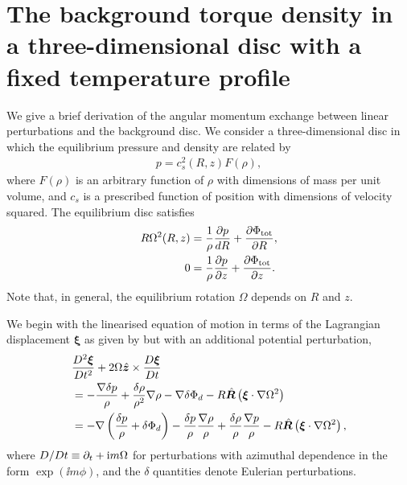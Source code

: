 \section{The background torque density in a three-dimensional disc with
  a fixed temperature profile}\label{tbg_deriv}
We give a brief derivation of the angular momentum exchange between
linear perturbations and the background disc. We consider a
three-dimensional disc in which the equilibrium pressure and density
are related by 
\begin{align}\label{iso_cond}
  p = c_s^2(R,z)F(\rho),
\end{align} 
where $F(\rho)$ is an arbitrary function of $\rho$ with dimensions of
mass per unit volume, and $c_s$ is a prescribed function of
position with dimensions of velocity squared. The equilibrium disc
satisfies 
\begin{align}
  R\Omega^2(R,z) &= \frac{1}{\rho}\frac{\partial p}{d R} +
  \frac{\partial\Phi_\mathrm{tot}}{\partial R}, \\
  0 &= \frac{1}{\rho}\frac{\partial p}{\partial z} + \frac{\partial\Phi_\mathrm{tot}}{\partial
    z}. 
\end{align}
Note that, in general, the equilibrium rotation $\Omega$ depends on
$R$ and $z$. 

We begin with the linearised equation of motion in terms of the
Lagrangian displacement $\bm{\xi}$ as given by \cite{lin93b} but with an
additional potential perturbation, 
\begin{align}\label{lagragian_pert}
  &\frac{D^2\bm{\xi}}{Dt^2} +
  2\Omega\hat{\bm{z}}\times\frac{D\bm{\xi}}{Dt}  \notag \\ &= -
  \frac{\nabla \delta p }{\rho} + \frac{\delta\rho}{\rho^2}\nabla\rho  
  -\nabla\delta\Phi_d - R
  \hat{\bm{R}}\left(\bm{\xi}\cdot\nabla\Omega^2\right) \notag \\
  & = -\nabla\left(\frac{\delta p}{\rho} + \delta \Phi_d\right) -
  \frac{\delta p}{\rho}\frac{\nabla\rho}{\rho} +
  \frac{\delta\rho}{\rho}\frac{\nabla p}{\rho} -  R
  \hat{\bm{R}}\left(\bm{\xi}\cdot\nabla\Omega^2\right),
\end{align}
where $D/Dt \equiv \partial_t + \mathrm{i} m \Omega$ for perturbations with
azimuthal dependence in the form $\exp\left(\ii m \phi\right)$, and  
the $\delta$ quantities denote Eulerian perturbations. %

